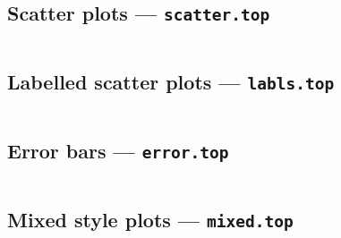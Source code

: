 
\def\scalea{0.7}
\def\scaleb{0.5}
\def\scalec{0.4}
\def\scaled{0.3}

\clearpage

\subsection{Scatter plots --- {\tt scatter.top}}

\vspace{1cm}

\begin{verbatim}

\end{verbatim}

\vspace{1cm}

\def\epsfsize#1#2{\scaleb #1}

\newpage

\subsection{Labelled scatter plots --- {\tt labls.top}}

\vspace{1cm}

\begin{verbatim}

\end{verbatim}

\vspace{1cm}

\def\epsfsize#1#2{\scalea #1}

\newpage

\subsection{Error bars --- {\tt error.top}}

\vspace{1cm}

\begin{verbatim}

\end{verbatim}

\vspace{1cm}
\def\epsfsize#1#2{\scalea #1}

\newpage

\subsection{Mixed style plots --- {\tt mixed.top}}

